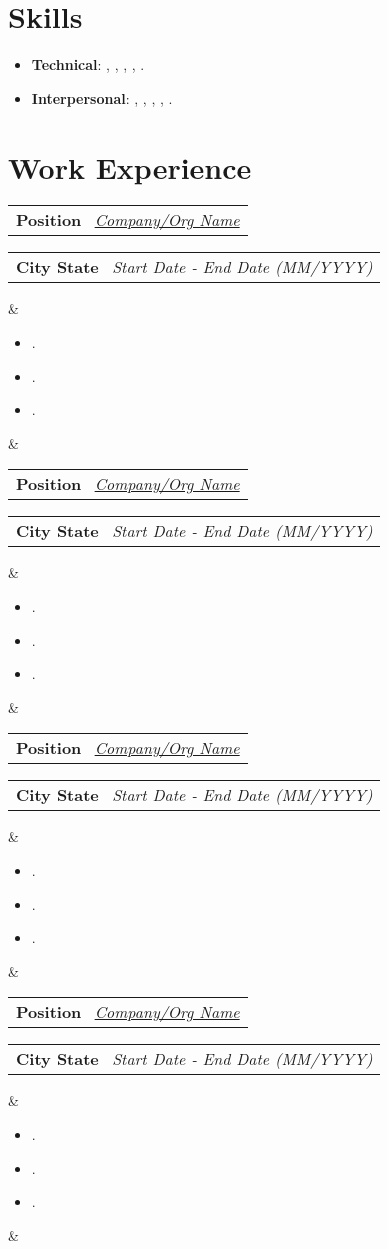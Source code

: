\documentclass[10pt,a4paper,garamond]{moderncv}
\makeatletter
\newcommand*{\customcventry}[7][.13em]{
\begin{tabular}{@{}l}
{\bfseries #4} \
{\itshape #3}
\end{tabular}
\hfill
\begin{tabular}{l@{}}
{\bfseries #5} \
{\itshape #2}
\end{tabular}
\ifx&#7&%
\else{\
\begin{minipage}{\maincolumnwidth}%
\small#7%
\end{minipage}}\fi%
\par\addvspace{#1}}
\makeatother
\begin{document}
\section{Skills}
\begin{itemize}[leftmargin=0.7cm, label=\circ]
\item \textbf{Technical}: , , , , .
\item \textbf{Interpersonal}: , , , , .
\end{itemize}

\section{Work Experience}
\customcventry{Start Date ‐ End Date (MM/YYYY)}{{\color{black}\href{https://www.google.com/}{Company/Org Name}}}{Position}{City State}{}{
{\begin{itemize}[leftmargin=0.7cm, label={\textbullet}]
\item .
\item .
\item .
\end{itemize}}}

\customcventry{Start Date ‐ End Date (MM/YYYY)}{{\color{black}\href{https://www.google.com/}{Company/Org Name}}}{Position}{City State}{}{
{\begin{itemize}[leftmargin=0.7cm, label={\textbullet}]
\item .
\item .
\item .
\end{itemize}}}

\customcventry{Start Date ‐ End Date (MM/YYYY)}{{\color{black}\href{https://www.google.com/}{Company/Org Name}}}{Position}{City State}{}{
{\begin{itemize}[leftmargin=0.7cm, label={\textbullet}]
\item .
\item .
\item .
\end{itemize}}}

\customcventry{Start Date ‐ End Date (MM/YYYY)}{{\color{black}\href{https://www.google.com/}{Company/Org Name}}}{Position}{City State}{}{
{\begin{itemize}[leftmargin=0.7cm, label={\textbullet}]
\item .
\item .
\item .
\end{itemize}}}
\end{document}
